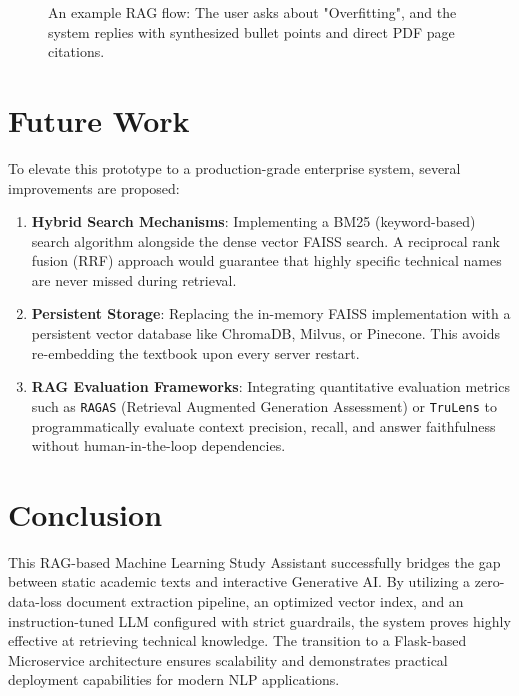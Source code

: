 \documentclass[12pt,a4paper]{article}
\begin{document}
\begin{figure}[H]
    \centering
    \frame{\rule{0pt}{7cm}\rule{14cm}{0pt}} %
    \caption{An example RAG flow: The user asks about "Overfitting", and the system replies with synthesized bullet points and direct PDF page citations.}
    \label{fig:screenshot2}
\end{figure}

\section{Future Work}
To elevate this prototype to a production-grade enterprise system, several improvements are proposed:
\begin{enumerate}
    \item \textbf{Hybrid Search Mechanisms}: Implementing a BM25 (keyword-based) search algorithm alongside the dense vector FAISS search. A reciprocal rank fusion (RRF) approach would guarantee that highly specific technical names are never missed during retrieval.
    \item \textbf{Persistent Storage}: Replacing the in-memory FAISS implementation with a persistent vector database like ChromaDB, Milvus, or Pinecone. This avoids re-embedding the textbook upon every server restart.
    \item \textbf{RAG Evaluation Frameworks}: Integrating quantitative evaluation metrics such as \texttt{RAGAS} (Retrieval Augmented Generation Assessment) or \texttt{TruLens} to programmatically evaluate context precision, recall, and answer faithfulness without human-in-the-loop dependencies.
\end{enumerate}

\section{Conclusion}
This RAG-based Machine Learning Study Assistant successfully bridges the gap between static academic texts and interactive Generative AI. By utilizing a zero-data-loss document extraction pipeline, an optimized vector index, and an instruction-tuned LLM configured with strict guardrails, the system proves highly effective at retrieving technical knowledge. The transition to a Flask-based Microservice architecture ensures scalability and demonstrates practical deployment capabilities for modern NLP applications.
\end{document}
